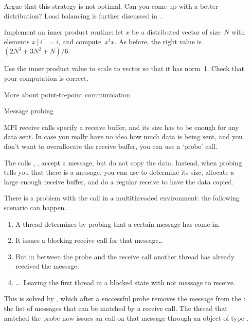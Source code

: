 \begin{exercise}
  Argue that this strategy is not optimal. Can you come up with a
  better distribution?
  Load balancing is further discussed in~.
\end{exercise}

\begin{exercise}
  \label{ex:inproduct}
  Implement an inner product routine: let $x$ be a
  distributed vector of size~$N$ with elements $x[i]=i$,
  and compute~$x^tx$.
  As before, the right value is $(2N^3+3N^2+N)/6$.

  Use the inner product value to scale to vector so that it has
  norm~1.
  Check that your computation is correct.
\end{exercise}





 {More about point-to-point communication}

 {Message probing}

MPI receive calls specify a receive buffer, and its size has to be
enough for any data sent. In case you really have no idea how much data
is being sent, and you don't want to overallocate the receive buffer,
you can use a `probe' call.

The calls , , accept a message,
but do not copy the data. Instead, when probing tells you that there is a
message, you can use  to determine its size,
allocate a large enough receive buffer, and do a regular receive to
have the data copied.



There is a problem with the  call in a
multithreaded environment: the following scenario can happen.
\begin{enumerate}
\item A thread determines by probing that a certain message has come
  in.
\item It issues a blocking receive call for that message\dots
\item But in between the probe and the receive call another thread
  has already received the message.
\item \dots~Leaving the first thread in a blocked state with not
  message to receive.
\end{enumerate}
This is solved by , which after a successful
probe removes the message from the : the
list of messages that can be matched by a receive call. The thread
that matched the probe now issues an  call on
that message through an object of type .

